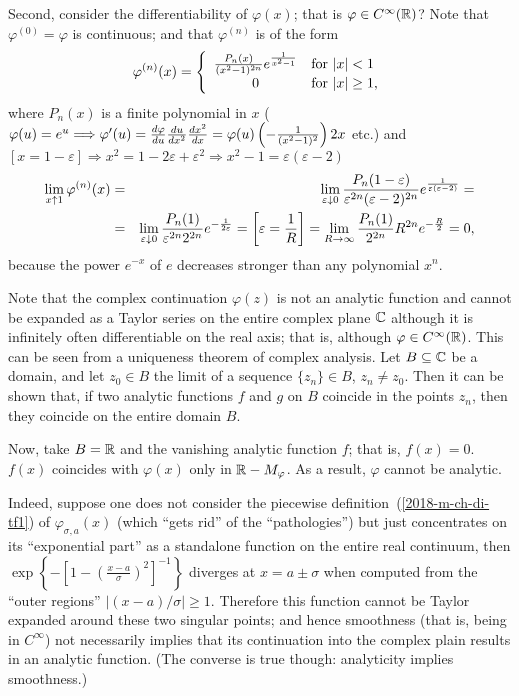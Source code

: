 {Second, consider the differentiability of $\varphi (x)$;
that is $\varphi\in C^\infty({\Bbb R})$?
Note that
$\varphi^{(0)}=\varphi$ is continuous;
and that $\varphi^{(n)}$ is of the form
$$
   \varphi^{(n)}(x)=\left\{\begin{array}{cl}
                         {P_n(x)\over(x^2-1)^{2n}}    e^{1\over x^2-1}&\mbox{for $|x|<1$}\\
                         0&\mbox{for $|x|\geq1$,}
                    \end{array}\right.
$$
where $P_n(x)$ is a finite polynomial in $x$
 ($\varphi(u)=e^u\Longrightarrow
\varphi'(u)={d\varphi\over du}{du\over dx^2}{dx^2\over dx}=\varphi(u)
\left(-{1\over(x^2-1)^2}\right)2x$ etc.) and $[x=1-\varepsilon]\Longrightarrow
x^2=1-2\varepsilon+\varepsilon^2\Longrightarrow x^2-1=
\varepsilon(\varepsilon-2)$
\begin{eqnarray*}
   \lim_{x\uparrow1}\varphi^{(n)}(x)&=&\lim_{\varepsilon\downarrow0}
      {P_n(1-\varepsilon)\over\varepsilon^{2n}(\varepsilon-2)^{2n}}
      e^{1\over\varepsilon(\varepsilon-2)}=\\
   &=&\lim_{\varepsilon\downarrow0}{P_n(1)\over\varepsilon^{2n}2^{2n}}
      e^{-{1\over2\varepsilon}}=\left[\varepsilon={1\over R}\right]=
      \lim_{R\to\infty}{P_n(1)\over2^{2n}}R^{2n}e^{-{R\over2}}=0,
\end{eqnarray*}
because the power $e^{-x}$ of $e$
decreases stronger
than any polynomial  $x^n$.

Note that the complex continuation
$\varphi (z)$ is not an analytic function and cannot be expanded as a Taylor series on the
entire complex plane ${\Bbb C}$ although it is infinitely often
differentiable on the real axis; that is, although
$\varphi\in C^\infty({\Bbb R})$.
This can be seen from a uniqueness theorem of complex analysis.
Let
 $B\subseteq{\Bbb C}$ be a domain, and
let
$z_0\in B$ the limit of a sequence
$\{z_n\}\in B$, $z_n\ne z_0$.
Then it can be shown that, if two
analytic functions
$f$ and $g$ on $B$  coincide in the points $z_n$,
then they coincide on the entire domain $B$.

Now, take  $B={\Bbb R}$ and
the  vanishing analytic function $f$; that is,
$f(x)=0$.
$f(x)$ coincides with $\varphi (x)$ only in
 ${\Bbb R} - M_\varphi$.
As a result, $\varphi$ cannot be analytic.

Indeed, suppose one does not consider  the piecewise definition~(\ref{2018-m-ch-di-tf1}) of $\varphi_{\sigma, a}(x)$
(which ``gets rid'' of the ``pathologies'')
but just concentrates on its ``exponential part'' as a standalone function on the entire real continuum,
then $\exp \left\{ -\left[ 1 - \left( \frac{x-a}{\sigma }\right)^2 \right]^{-1} \right\}$ diverges at $x=a\pm\sigma$  when
computed from the ``outer regions''  $\left\vert  (x-a)/ \sigma \right\vert \ge 1$.
Therefore this function cannot be Taylor expanded around these two singular points;
and hence smoothness (that is, being in  $C^\infty$)
not necessarily implies that its continuation into the complex plain results in an analytic function. (The converse is true though: analyticity implies smoothness.)
\eproof
}

